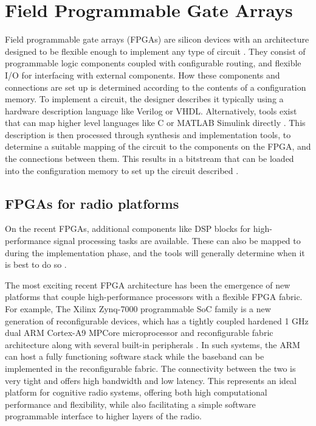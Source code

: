 \section{Field Programmable Gate Arrays }
Field programmable gate arrays (FPGAs) are silicon devices with an architecture designed to be flexible enough to implement any type of circuit \cite{Kuon2008}.
They consist of programmable logic components coupled with configurable routing, and flexible I/O for interfacing with external components.
How these components and connections are set up is determined according to the contents of a configuration memory.
To implement a circuit, the designer describes it typically using a hardware description language like Verilog or VHDL.
Alternatively, tools exist that can map higher level languages like C or MATLAB Simulink directly \cite{Springer2008}.
This description is then processed through synthesis and implementation tools, to determine a suitable mapping of the circuit to the components on the FPGA, and the connections between them.
This results in a bitstream that can be loaded into the configuration memory to set up the circuit described \cite{Xilinx2013c}.
\subsection{FPGAs for radio platforms}
On the recent FPGAs, additional components like DSP blocks for high-performance signal processing tasks are available.
These can also be mapped to during the implementation phase, and the tools will generally determine when it is best to do so \cite{Xilinx2013d}.

The most exciting recent FPGA architecture has been the emergence of new platforms that couple high-performance processors with a flexible FPGA fabric. 
For example, The Xilinx Zynq-7000 programmable SoC family is a new generation of reconfigurable devices, which has a tightly coupled hardened 1 GHz dual ARM Cortex-A9 MPCore microprocessor and reconfigurable fabric architecture along with several built-in peripherals \cite{Xilinx2013}.
In such systems, the ARM can host a fully functioning software stack while the baseband can be implemented in the reconfigurable fabric. The connectivity between the two is very tight and offers high bandwidth and low latency. This represents an ideal platform for cognitive radio systems, offering both high computational performance and flexibility, while also facilitating a simple software programmable interface to higher layers of the radio.

